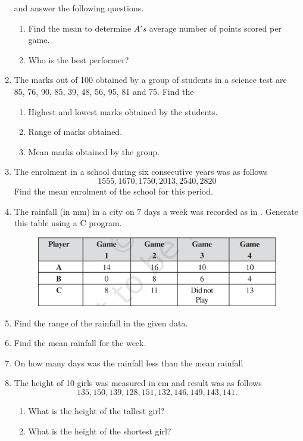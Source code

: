 \begin{enumerate}[label=\thesection.\arabic*, ref=\thesection.\theenumi]
\begin{figure}[H]
  \caption{}
  \label{fig:data}
\end{figure}
and answer the following questions.
\begin{enumerate}
	\item Find the mean to determine $A's$ average number of points scored per game.
	\item Who is the best performer?
\end{enumerate}
\item The marks out of 100 obtained by a group of students in a science test are 85, 76, 90, 85, 39, 48, 56, 95, 81 and 75.  Find the 
	\begin{enumerate}
		\item Highest and lowest marks obtained by the students.
		\item Range of marks obtained.
		\item  Mean marks obtained by the group.
	\end{enumerate}
\item The enrolment in a school during six consecutive years was as follows  
	$$1555, 1670, 1750, 2013, 2540, 2820$$
	Find the mean enrolment of the school for this period.
\item The rainfall (in mm) in a city on 7 days a week was recorded as in 
  .  Generate this table using a C program.
	\begin{figure}[H]
  \centering
  \includegraphics[width=\columnwidth]{figs/data.jpg}
  \caption{}
  \label{fig:data2}
\end{figure}
\item Find the range of the rainfall in the given data.
\item Find the mean rainfall for the week.
\item On how many days was the rainfall less than the mean rainfall 
\item The height of 10 girls was measured in cm and result was as follows
	$$135, 150, 139, 128, 151, 132, 146, 149, 143, 141.$$
	\begin{enumerate}
		\item What is the height of the tallest girl?
		\item What is the height of the shortest girl?

\end{enumerate}
\end{enumerate}
